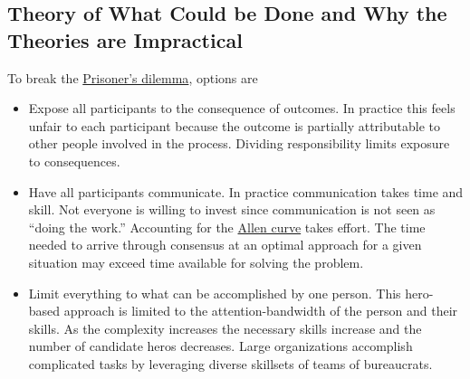\subsection*{Theory of What Could be Done and Why the Theories are Impractical}


To break the \href{https://en.wikipedia.org/wiki/Prisoner\%27s\_dilemma}{Prisoner's dilemma}, options are 
\begin{itemize}
    \item Expose all participants to the consequence of outcomes. In practice this feels unfair to each participant because the outcome is partially attributable to other people involved in the process. Dividing responsibility limits exposure to consequences.
    \item Have all participants communicate. In practice communication takes time and skill. Not everyone is willing to invest since communication is not seen as ``doing the work.'' Accounting for the \href{https://en.wikipedia.org/wiki/Allen\_curve}{Allen curve} takes effort. The time needed to arrive through consensus at an optimal approach for a given situation may exceed time available for solving the problem.
    \item Limit everything to what can be accomplished by one person. This hero-based approach is limited to the attention-bandwidth of the person and their skills. As the complexity increases the necessary skills increase and the number of candidate heros decreases. Large organizations accomplish complicated tasks by leveraging diverse skillsets of teams of bureaucrats.

\end{itemize}


 
 